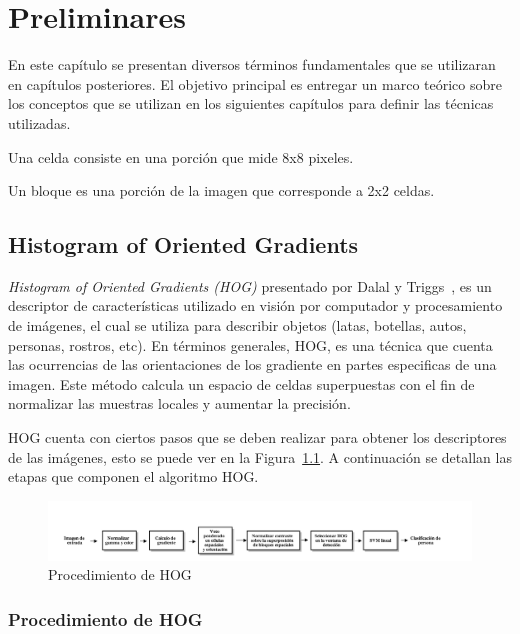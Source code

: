 \chapter[Preliminares ]{Preliminares }\label{ch:capitulo3}
En este capítulo se presentan diversos términos fundamentales que se utilizaran en capítulos posteriores. El objetivo principal es entregar un marco teórico sobre los conceptos que se utilizan en los siguientes capítulos para definir las técnicas utilizadas.
\begin{definition}[Celdas]
\label{def:cel}
Una celda consiste en una porción que mide 8x8 pixeles.
\end{definition}
\begin{definition}[Bloques]
\label{def:blo}
Un bloque es una porción de la imagen que corresponde a 2x2 celdas.
\end{definition}

\section{Histogram of Oriented Gradients}
\label{subsec:hog}
\textit{Histogram of Oriented Gradients (HOG)} presentado por Dalal y Triggs~\cite{hog2005}, es un descriptor de características utilizado en visión por computador y procesamiento de imágenes, el cual se utiliza para describir objetos (latas, botellas, autos, personas, rostros, etc). En términos generales, HOG, es una técnica que cuenta las ocurrencias de las orientaciones de los gradiente en partes especificas de una imagen. Este método calcula un espacio de celdas superpuestas con el fin de normalizar las muestras locales y aumentar la precisión.

HOG cuenta con ciertos pasos que se deben realizar para obtener los descriptores de las imágenes, esto se puede ver en la Figura~\ref{fig:hog_procedure}. A continuación se detallan las etapas que componen el algoritmo HOG.
\begin{figure}[tb]
  \centering
   \includegraphics[width=1\textwidth]{Figuras/hog-procedure.png}
   \caption{Procedimiento de HOG}
   \label{fig:hog_procedure}
\end{figure}

\subsection{Procedimiento de HOG}

